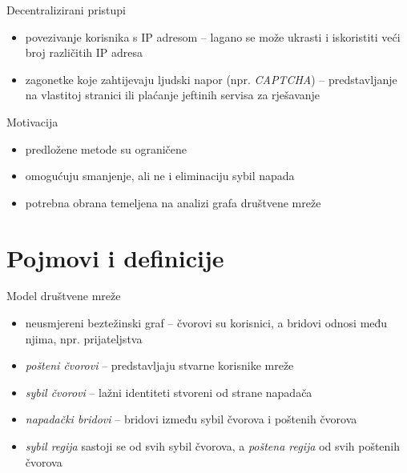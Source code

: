 \documentclass{beamer}
\begin{document}
\begin{frame}{Decentralizirani pristupi}
  \begin{itemize}
    \item povezivanje korisnika s IP adresom -- lagano se može ukrasti i iskoristiti veći broj različitih IP adresa
    \item zagonetke koje zahtijevaju ljudski napor (npr. \textit{CAPTCHA}) -- predstavljanje na vlastitoj stranici ili plaćanje jeftinih servisa za rješavanje
  \end{itemize}
\end{frame}

\begin{frame}{Motivacija}
  \begin{itemize}
    \item predložene metode su ograničene
    \item omogućuju smanjenje, ali ne i eliminaciju sybil napada
    \item potrebna obrana temeljena na analizi grafa društvene mreže
  \end{itemize}
\end{frame}

\section{Pojmovi i definicije}

\begin{frame}{Model društvene mreže}
  \begin{itemize}
    \item neusmjereni beztežinski graf -- čvorovi su korisnici, a bridovi odnosi među njima, npr. prijateljstva
    \item \textit{pošteni čvorovi} -- predstavljaju stvarne korisnike mreže
    \item \textit{sybil čvorovi} -- lažni identiteti stvoreni od strane napadača
    \item \textit{napadački bridovi} -- bridovi između sybil čvorova i poštenih čvorova
    \item \textit{sybil regija} sastoji se od svih sybil čvorova, a \textit{poštena regija} od svih poštenih čvorova
  \end{itemize}
\end{frame}
\end{document}
